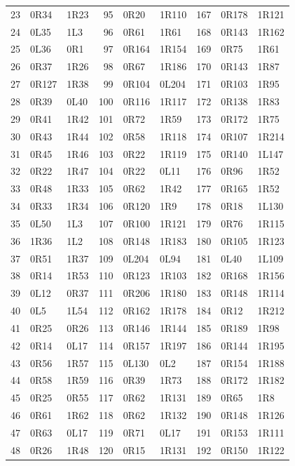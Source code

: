 \begin{longtable}{rll@{\quad}rll@{\quad}rll}
23 & 0R34 & 1R23 & 95 & 0R20 & 1R110 & 167 & 0R178 & 1R121 \\
24 & 0L35 & 1L3 & 96 & 0R61 & 1R61 & 168 & 0R143 & 1R162 \\
25 & 0L36 & 0R1 & 97 & 0R164 & 1R154 & 169 & 0R75 & 1R61 \\
26 & 0R37 & 1R26 & 98 & 0R67 & 1R186 & 170 & 0R143 & 1R87 \\
27 & 0R127 & 1R38 & 99 & 0R104 & 0L204 & 171 & 0R103 & 1R95 \\
28 & 0R39 & 0L40 & 100 & 0R116 & 1R117 & 172 & 0R138 & 1R83 \\
29 & 0R41 & 1R42 & 101 & 0R72 & 1R59 & 173 & 0R172 & 1R75 \\
30 & 0R43 & 1R44 & 102 & 0R58 & 1R118 & 174 & 0R107 & 1R214 \\
31 & 0R45 & 1R46 & 103 & 0R22 & 1R119 & 175 & 0R140 & 1L147 \\
32 & 0R22 & 1R47 & 104 & 0R22 & 0L11 & 176 & 0R96 & 1R52 \\
33 & 0R48 & 1R33 & 105 & 0R62 & 1R42 & 177 & 0R165 & 1R52 \\
34 & 0R33 & 1R34 & 106 & 0R120 & 1R9 & 178 & 0R18 & 1L130 \\
35 & 0L50 & 1L3 & 107 & 0R100 & 1R121 & 179 & 0R76 & 1R115 \\
36 & 1R36 & 1L2 & 108 & 0R148 & 1R183 & 180 & 0R105 & 1R123 \\
37 & 0R51 & 1R37 & 109 & 0L204 & 0L94 & 181 & 0L40 & 1L109 \\
38 & 0R14 & 1R53 & 110 & 0R123 & 1R103 & 182 & 0R168 & 1R156 \\
39 & 0L12 & 0R37 & 111 & 0R206 & 1R180 & 183 & 0R148 & 1R114 \\
40 & 0L5 & 1L54 & 112 & 0R162 & 1R178 & 184 & 0R12 & 1R212 \\
41 & 0R25 & 0R26 & 113 & 0R146 & 1R144 & 185 & 0R189 & 1R98 \\
42 & 0R14 & 0L17 & 114 & 0R157 & 1R197 & 186 & 0R144 & 1R195 \\
43 & 0R56 & 1R57 & 115 & 0L130 & 0L2 & 187 & 0R154 & 1R188 \\
44 & 0R58 & 1R59 & 116 & 0R39 & 1R73 & 188 & 0R172 & 1R182 \\
45 & 0R25 & 0R55 & 117 & 0R62 & 1R131 & 189 & 0R65 & 1R8 \\
46 & 0R61 & 1R62 & 118 & 0R62 & 1R132 & 190 & 0R148 & 1R126 \\
47 & 0R63 & 0L17 & 119 & 0R71 & 0L17 & 191 & 0R153 & 1R111 \\
48 & 0R26 & 1R48 & 120 & 0R15 & 1R131 & 192 & 0R150 & 1R122 \\

\end{longtable}
